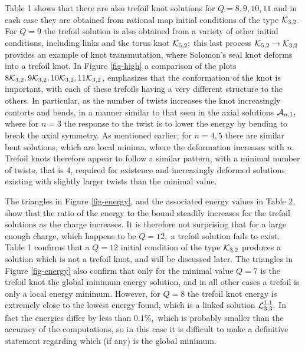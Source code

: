 \documentclass[12pt]{article}
\begin{document}
Table 1 shows that there are also trefoil knot solutions for
$Q=8,9,10,11$ and in each case they are obtained from rational map
initial conditions of the type ${\cal K}_{3,2}.$ For $Q=9$ the
trefoil solution is also obtained from a variety of other initial
conditions, including links and the torus knot ${\cal K}_{5,2};$
this last process ${\cal K}_{5,2}\rightarrow{\cal K}_{3,2}$ provides
an example of knot transmutation, where Solomon's seal knot deforms
into a trefoil knot. In Figure \ref{fig-high} a comparison of the 
plots $8{\cal K}_{3,2},9{\cal K}_{3,2},10{\cal K}_{3,2},11{\cal K}_{3,2}$,
emphasizes that the conformation of the knot is important, with each
of these trefoils having a very different structure to the others.
In particular, as the number of twists increases the knot
increasingly contorts and bends, in a manner similar to that seen in
the axial solutions ${\cal A}_{n,1},$ where for $n=3$ the response
to the twist is to lower the energy by bending to break the axial
symmetry. As mentioned earlier, for $n=4,5$ there are similar bent
solutions, which are local minima, where the deformation increases
with $n.$ Trefoil knots therefore appear to follow a similar
pattern, with a minimal number of twists, that is 4, required for
existence and increasingly deformed solutions existing with slightly
larger twists than the minimal value.

The triangles in Figure \ref{fig-energy}, and the associated energy values in
Table 2, show that the ratio of the energy to the bound steadily increases for
the trefoil solutions as the charge increases. It is therefore not
surprising that for a large enough charge, which happens to be
$Q=12,$ a trefoil solution fails to exist. Table 1 confirms that a
$Q=12$ initial condition of the type ${\cal K}_{3,2}$ produces  a
solution which is not a trefoil knot, and will be discussed later.
The triangles in Figure \ref{fig-energy} also confirm that only for the minimal
value $Q=7$ is the trefoil knot the global minimum energy solution,
and in all other cases a trefoil is only a local energy minimum.
However, for $Q=8$ the trefoil knot energy is extremely close to the
lowest energy found, which is a linked solution ${\cal
L}_{3,3}^{1,1}.$ In fact the energies differ by less than $0.1\%,$
which is probably smaller than the accuracy of the computations, so
in this case it is difficult to make a definitive statement
regarding which (if any) is the global minimum.
\end{document}
